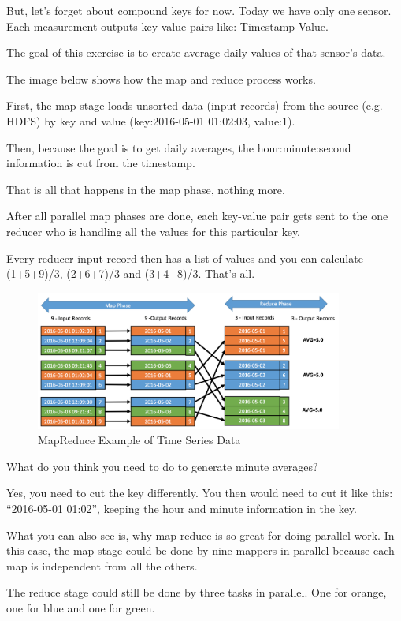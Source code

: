\documentclass[12pt, numbers=noenddot]{scrreprt} %
\begin{document}
But, let’s forget about compound keys for now. Today we have only one sensor. Each measurement outputs key-value pairs like: Timestamp-Value.

The goal of this exercise is to create average daily values of that sensor’s data.

The image below shows how the map and reduce process works.

First, the map stage loads unsorted data (input records) from the source (e.g. HDFS) by key and value (key:2016-05-01 01:02:03, value:1).

Then, because the goal is to get daily averages, the hour:minute:second information is cut from the timestamp.

That is all that happens in the map phase, nothing more.

After all parallel map phases are done, each key-value pair gets sent to the one reducer who is handling all the values for this particular key.

Every reducer input record then has a list of values and you can calculate (1+5+9)/3, (2+6+7)/3 and (3+4+8)/3. That’s all.

\begin{figure}[htbp]
  \centering
     \includegraphics[width=0.9\textwidth]{images/MapReduce-Time-Series-example.png}
  \caption{MapReduce Example of Time Series Data}
  \label{fig:Bild1}
\end{figure}

What do you think you need to do to generate minute averages?

Yes, you need to cut the key differently. You then would need to cut it like this: “2016-05-01 01:02”, keeping the hour and minute information in the key.

What you can also see is, why map reduce is so great for doing parallel work. In this case, the map stage could be done by nine mappers in parallel because each map is independent from all the others.

The reduce stage could still be done by three tasks in parallel. One for orange, one for blue and one for green.
\end{document}
